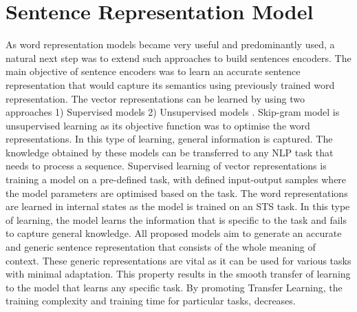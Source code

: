 \documentclass[12pt]{report} %
\begin{document}
\section{Sentence Representation Model}
As word representation models became very useful and predominantly used, a natural next step was to extend such approaches to build sentences encoders. The main objective of sentence encoders was to learn an accurate sentence representation that would capture its semantics using previously trained word representation.
The vector representations can be learned by using two approaches 1) Supervised models \citep{conneau2017supervised} 2) Unsupervised models \citep{kiros2015skip}. Skip-gram model is unsupervised learning as its objective function was to optimise the word representations. In this type of learning, general information is captured. The knowledge obtained by these models can be transferred to any NLP task that needs to process a sequence. Supervised learning of vector representations is training a model on a pre-defined task, with defined input-output samples where the model parameters are optimised based on the task. The word representations are learned in internal states as the model is trained on an STS task. In this type of learning, the model learns the information that is specific to the task and fails to capture general knowledge. All proposed models aim to generate an accurate and generic sentence representation that consists of the whole meaning of context. These generic representations are vital as it can be used for various tasks with minimal adaptation. This property results in the smooth transfer of learning to the model that learns any specific task. By promoting Transfer Learning, the training complexity and training time for particular tasks, decreases.  

%
%
%
% 
\end{document}
